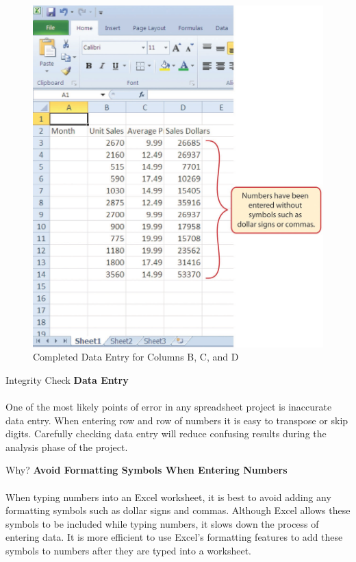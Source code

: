 \begin{figure}[H]
	\centering
	\includegraphics[width=\maxwidth{.95\linewidth}]{gfx/ch01_fig16}
	\caption{Completed Data Entry for Columns B, C, and D}
	\label{01:fig16}
\end{figure}

\begin{center}
	\begin{infobox}{Integrity Check}
		\textbf{Data Entry}
		\\
		\\
		One of the most likely points of error in any spreadsheet project is inaccurate data entry. When entering row and row of numbers it is easy to transpose or skip digits. Carefully checking data entry will reduce confusing results during the analysis phase of the project.
	\end{infobox}
\end{center}

\begin{center}
	\begin{infobox}{Why?}
		\textbf{Avoid Formatting Symbols When Entering Numbers}
		\\
		\\
		When typing numbers into an Excel worksheet, it is best to avoid adding any formatting symbols such as dollar signs and commas. Although Excel allows these symbols to be included while typing numbers, it slows down the process of entering data. It is more efficient to use Excel's formatting features to add these symbols to numbers after they are typed into a worksheet.
	\end{infobox}
\end{center}

